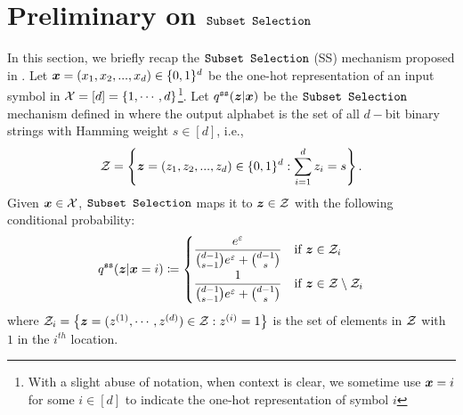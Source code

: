 \section{Preliminary on \texorpdfstring{$\texttt{Subset Selection}$}{Subset Selection}}
\label{appendix:ss}

In this section, we briefly recap the $\texttt{Subset Selection}$ (SS) mechanism proposed in \cite{YB18}.
Let ${\boldsymbol{x}} = (x_1, x_2,...,x_d) \in \{0, 1\}^d$ be the one-hot representation of an input symbol in $\mathcal{X} = [d] = \{1,\cdots, d\}$\footnote{With a slight abuse of notation, when context is clear, we sometime use ${\boldsymbol{x}} = i$ for some $ i \in [d]$ to indicate the one-hot representation of symbol $i$}. Let $q^{\texttt{ss}}({\boldsymbol{z}}|{\boldsymbol{x}})$ be the $\texttt{Subset Selection}$ mechanism defined in \cite{YB18} where the output alphabet is the set of all $d-$bit binary strings with Hamming weight $s \in [d]$, i.e.,
\begin{align}
\mathcal{Z} = \left\{ {\boldsymbol{z}} = (z_1, z_2,...,z_d) \in \{0, 1\}^d: \sum_{i=1}^d z_i = s \right\}. \label{eq:z_ss}    
\end{align}
Given ${\boldsymbol{x}} \in \mathcal{X}$,  $\texttt{Subset Selection}$ maps it to ${\boldsymbol{z}} \in \mathcal{Z}$ with the following conditional probability:
\begin{align}\label{eq:q_ss_app}
    q^{\texttt{ss}}({\boldsymbol{z}}|{\boldsymbol{x}} = i) \coloneqq \begin{cases}
    \dfrac{e^{\varepsilon}}{{ \binom{d-1}{s-1} }e^{\varepsilon}+{ \binom{d-1}{s} }} & \text{if}\ {\boldsymbol{z}} \in \mathcal{Z}_{i}
    \\[10pt]
    \dfrac{1}{{ \binom{d-1}{s-1} }e^{\varepsilon}+{ \binom{d-1}{s} }} & \text{if}\ {\boldsymbol{z}} \in \mathcal{Z} \setminus \mathcal{Z}_{i}
    \end{cases}
\end{align}
where $\mathcal{Z}_{i} = \left\{ {\boldsymbol{z}} = (z^{(1)}, \cdots ,z^{(d)}) \in \mathcal{Z} : z^{(i)} = 1 \right\}$ is the set of elements in $\mathcal{Z}$ with $1$ in the $i^{th}$ location.


